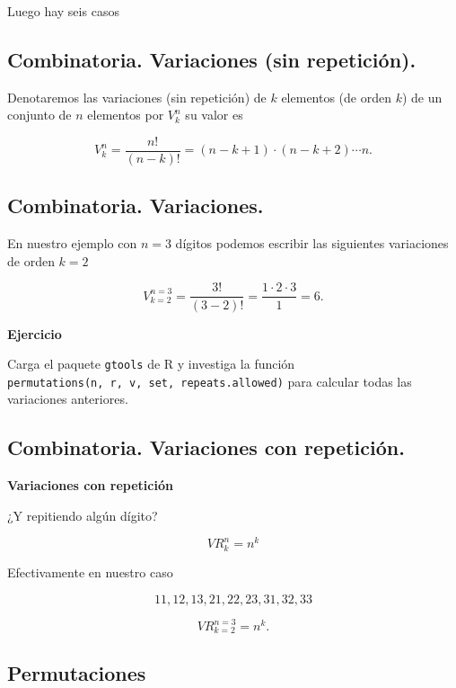 \documentclass[]{book}
\begin{document}
Luego hay seis casos

\hypertarget{combinatoria.-variaciones-sin-repeticiuxf3n.}{%
\subsection{Combinatoria. Variaciones (sin repetición).}\label{combinatoria.-variaciones-sin-repeticiuxf3n.}}

Denotaremos las variaciones (sin repetición) de \(k\) elementos (de orden \(k\)) de un conjunto de \(n\) elementos por \(V^n_k\) su valor es

\[
V^n_k=\frac{n!}{(n-k)!}=(n-k+1)\cdot (n-k+2)\cdots n.
\]

\hypertarget{combinatoria.-variaciones.-1}{%
\subsection{Combinatoria. Variaciones.}\label{combinatoria.-variaciones.-1}}

En nuestro ejemplo con \(n=3\) dígitos podemos escribir las siguientes variaciones de orden \(k=2\)

\[
V_{k=2}^{n=3}=\frac{3!}{(3-2)!}=\frac{1\cdot 2\cdot 3}{1}=6.
\]

\textbf{Ejercicio}

Carga el paquete \texttt{gtools} de R y investiga la función \texttt{permutations(n,\ r,\ v,\ set,\ repeats.allowed)} para calcular todas las variaciones anteriores.

\hypertarget{combinatoria.-variaciones-con-repeticiuxf3n.}{%
\subsection{Combinatoria. Variaciones con repetición.}\label{combinatoria.-variaciones-con-repeticiuxf3n.}}

\textbf{Variaciones con repetición}

¿Y repitiendo algún dígito?

\[VR^n_k=n^k\]

Efectivamente en nuestro caso

\[11,12,13,21,22,23,31,32,33\]

\[
VR_{k=2}^{n=3}=n^k.
\]

\hypertarget{permutaciones}{%
\subsection{Permutaciones}\label{permutaciones}}
\end{document}
